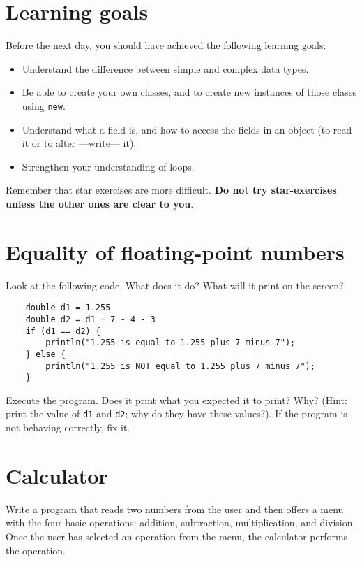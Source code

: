 \documentclass{article}
\begin{document}
\section*{Learning goals}
\label{sec:learning-goals}

Before the next day, you should have achieved the following learning
goals: 

\begin{itemize}
\item Understand the difference between simple and complex data types. 
\item Be able to create your own classes, and to create new instances
  of those clases using \verb+new+.
\item Understand what a field is, and how to access the fields in an
  object (to read it or to alter ---write--- it). 
\item Strengthen your understanding of loops. 
\end{itemize}

Remember that star exercises are more difficult. 
\textbf{Do not try star-exercises unless the other ones are clear to
  you}.  

\section{Equality of floating-point numbers}
\label{sec:eq}

Look at the following code. What does it do? What will it print on the screen?

\begin{verbatim}
    double d1 = 1.255
    double d2 = d1 + 7 - 4 - 3
    if (d1 == d2) {
        println("1.255 is equal to 1.255 plus 7 minus 7");
    } else {
        println("1.255 is NOT equal to 1.255 plus 7 minus 7");
    }
\end{verbatim}

Execute the program. Does it print what you expected it to print? Why?
(Hint: print the value of \verb+d1+ and \verb+d2+; why do they have
these values?). If the program is not behaving correctly, fix it. 

\section{Calculator}
\label{sec:calculator}

Write a program that reads two numbers from the user and then offers a
menu with the four basic operations: addition, subtraction,
multiplication, and division. Once the user has selected an operation
from the menu, the calculator performs the operation.
\end{document}
